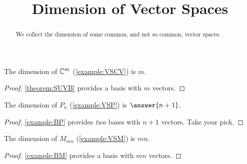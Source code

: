 \documentclass{ximera}
\title{Dimension of Vector Spaces}
\begin{document}
\begin{abstract}
  We collect the dimension of some common, and not so common, vector spaces.
\end{abstract}
\maketitle

\begin{theorem}
  \label{theorem:DCM}

  The dimension of $\mathbb{C}^{m}$ (\ref{example:VSCV}) is $m$.

  \begin{proof}
    \ref{theorem:SUVB} provides a basis with $m$ vectors.
  \end{proof}
\end{theorem}

\begin{theorem}[Dimension of $P_n$]
  \label{theorem:DP}

  The dimension of $P_{n}$  (\ref{example:VSP}) is $\answer{n+1}$.

  \begin{feedback}[correct]
    \begin{proof}
      \ref{example:BP} provides \textit{two} bases with $n+1$ vectors.  Take your pick.
    \end{proof}
  \end{feedback}
\end{theorem}

\begin{theorem}[Dimension of $M_{mn}$]
  \label{theorem:DM}

  The dimension of $M_{mn}$  (\ref{example:VSM}) is $mn$.
  
  \begin{proof}
    \ref{example:BM} provides a basis with $mn$ vectors.
  \end{proof}
\end{theorem}
\end{document}
